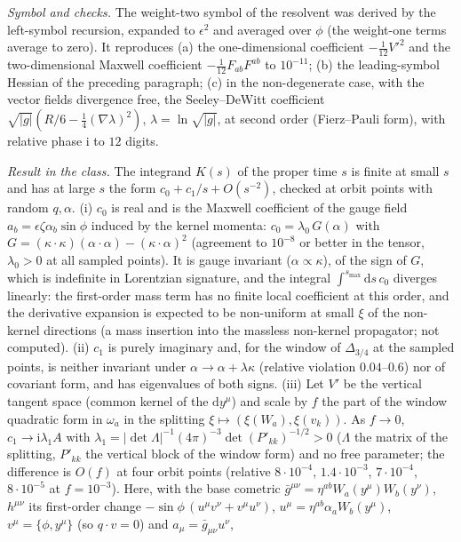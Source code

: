 \emph{Symbol and checks.} The weight-two symbol of the resolvent was derived by the left-symbol recursion, expanded to \(\epsilon^2\) and averaged over \(\phi\) (the weight-one terms average to zero). It reproduces (a) the one-dimensional coefficient \(-\tfrac1{12}V'^2\) and the two-dimensional Maxwell coefficient \(-\tfrac1{12}F_{ab}F^{ab}\) to \(10^{-11}\); (b) the leading-symbol Hessian of the preceding paragraph; (c) in the non-degenerate case, with the vector fields divergence free, the Seeley--DeWitt coefficient \(\sqrt{|g|}(R/6-\tfrac14(\nabla\lambda)^2)\), \(\lambda=\ln\sqrt{|g|}\), at second order (Fierz--Pauli form), with relative phase \(\mathrm i\) to \(12\) digits.

\emph{Result in the class.} The integrand \(K(s)\) of the proper time \(s\) is finite at small \(s\) and has at large \(s\) the form \(c_0+c_1/s+O(s^{-2})\), checked at orbit points with random \(q,\alpha\). (i) \(c_0\) is real and is the Maxwell coefficient of the gauge field \(a_b=\epsilon\zeta\alpha_b\sin\phi\) induced by the kernel momenta: \(c_0=\lambda_0\,G(\alpha)\) with \(G=(\kappa\cdot\kappa)(\alpha\cdot\alpha)-(\kappa\cdot\alpha)^2\) (agreement to \(10^{-8}\) or better in the tensor, \(\lambda_0>0\) at all sampled points). It is gauge invariant (\(\alpha\propto\kappa\)), of the sign of \(G\), which is indefinite in Lorentzian signature, and the integral \(\int^{s_{\max}}\mathrm ds\,c_0\) diverges linearly: the first-order mass term has no finite local coefficient at this order, and the derivative expansion is expected to be non-uniform at small \(\xi\) of the non-kernel directions (a mass insertion into the massless non-kernel propagator; not computed). (ii) \(c_1\) is purely imaginary and, for the window of \(\Delta_{3/4}\) at the sampled points, is neither invariant under \(\alpha\to\alpha+\lambda\kappa\) (relative violation \(0.04\)--\(0.6\)) nor of covariant form, and has eigenvalues of both signs. (iii) Let \(V'\) be the vertical tangent space (common kernel of the \(\mathrm dy^\mu\)) and scale by \(f\) the part of the window quadratic form in \(\omega_a\) in the splitting \(\xi\mapsto(\xi(W_a),\xi(v_k))\). As \(f\to0\), \(c_1\to\mathrm i\lambda_1 A\) with \(\lambda_1=|\det\Lambda|^{-1}(4\pi)^{-3}\det(P'_{kk})^{-1/2}>0\) (\(\Lambda\) the matrix of the splitting, \(P'_{kk}\) the vertical block of the window form) and no free parameter; the difference is \(O(f)\) at four orbit points (relative \(8\cdot10^{-4}\), \(1.4\cdot10^{-3}\), \(7\cdot10^{-4}\), \(8\cdot10^{-5}\) at \(f=10^{-3}\)). Here, with the base cometric \(\bar g^{\mu\nu}=\eta^{ab}W_a(y^\mu)W_b(y^\nu)\), \(h^{\mu\nu}\) its first-order change \(-\sin\phi\,(u^\mu v^\nu+v^\mu u^\nu)\), \(u^\mu=\eta^{ab}\alpha_aW_b(y^\mu)\), \(v^\mu=\{\phi,y^\mu\}\) (so \(q\cdot v=0\)) and \(a_\mu=\bar g_{\mu\nu}u^\nu\),
